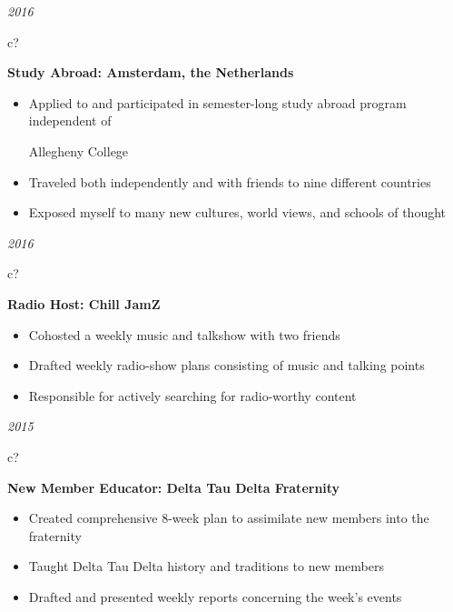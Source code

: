 \documentclass[12pt,a4paper,sans]{moderncv} %
\begin{document}
   \hspace{11 mm}
 \textit{2016}
\hspace{2 mm}
\begin{tabular}{c?}
 \\
\end{tabular}
 \hspace{2 mm}
 \textbf{Study Abroad: Amsterdam, the Netherlands} 
 \vspace{0 mm}
 \begin{itemize}
 \addtolength{\itemindent}{31.7 mm}
 \item{Applied to and participated in semester-long study abroad program independent of 
 
  \hspace{31.7 mm}Allegheny College}
  
  
 \item{Traveled both independently and with friends to nine different countries}
 \item{Exposed myself to many new cultures, world views, and schools of thought}
 \end{itemize}
 
    \hspace{11 mm}
 \textit{2016}
\hspace{2 mm}
\begin{tabular}{c?}
 \\
\end{tabular}
 \hspace{2 mm}
 \textbf{Radio Host: Chill JamZ} 
 \vspace{0 mm}
 \begin{itemize}
 \addtolength{\itemindent}{31.7 mm}
 \item{Cohosted a weekly music and talkshow with two friends}
 \item{Drafted weekly radio-show plans consisting of music and talking points}
 \item{Responsible for actively searching for radio-worthy content}
 \end{itemize}
 
  \hspace{11 mm}
 \textit{2015}
\hspace{2 mm}
\begin{tabular}{c?}
 \\
\end{tabular}
 \hspace{2 mm}
 \textbf{New Member Educator: Delta Tau Delta Fraternity} 
 \vspace{0 mm}
 \begin{itemize}
 \addtolength{\itemindent}{31.7 mm}
 \item{Created comprehensive 8-week plan to assimilate new members into the fraternity}
 \item{Taught Delta Tau Delta history and traditions to new members}
 \item{Drafted and presented weekly reports concerning the week's events}
 \end{itemize}
 
\end{document}
